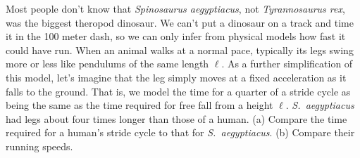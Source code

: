 Most people don't know that \emph{Spinosaurus aegyptiacus}, not \emph{Tyrannosaurus rex},
was the biggest theropod dinosaur. We can't put a dinosaur on a track and time it in the 100 meter
dash, so we can only infer from physical models how fast it could have run. When an
animal walks at a normal pace, typically its legs swing more or less like pendulums of
the same length $\ell$. As a further simplification of this model, let's imagine that the leg
simply moves at a fixed acceleration as it falls to the ground.
That is, we model the time for a quarter of a stride cycle as being
the same as the time required for free fall from a height $\ell$.
\emph{S.~aegyptiacus} had legs about four times longer than those of a human.
(a) Compare the time required for a human's stride cycle to that for \emph{S.~aegyptiacus}.\answercheck\hwendpart
(b) Compare their running speeds.\answercheck
